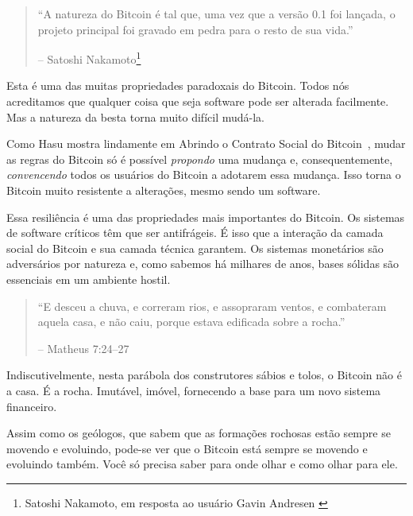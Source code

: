 \begin{quotation}\begin{samepage}
\enquote{A natureza do Bitcoin é tal que, uma vez que a versão 0.1 foi lançada, o projeto principal foi gravado em pedra para o resto de sua vida.}
\begin{flushright} -- Satoshi Nakamoto\footnote{Satoshi Nakamoto, em resposta ao usuário Gavin Andresen \cite{satoshi-centralized-nature}}
\end{flushright}\end{samepage}\end{quotation}

Esta é uma das muitas propriedades paradoxais do Bitcoin. Todos nós acreditamos que qualquer coisa que seja software pode ser alterada facilmente. Mas a natureza da besta torna muito difícil mudá-la.

Como Hasu mostra lindamente em Abrindo o Contrato Social do Bitcoin~\cite{contrato-social}, mudar as regras do Bitcoin só é possível \textit{propondo} uma mudança e, consequentemente, \textit{convencendo} todos os usuários do Bitcoin a adotarem essa mudança. Isso torna o Bitcoin muito resistente a alterações, mesmo sendo um software.

Essa resiliência é uma das propriedades mais importantes do Bitcoin. Os sistemas de software críticos têm que ser antifrágeis. É isso que a interação da camada social do Bitcoin e sua camada técnica garantem. Os sistemas monetários são adversários por natureza e, como sabemos há milhares de anos, bases sólidas são essenciais em um ambiente hostil.

\begin{quotation}\begin{samepage}
\enquote{E desceu a chuva, e correram rios, e assopraram ventos, e combateram aquela casa, e não caiu, porque estava edificada sobre a rocha.}
\begin{flushright} -- Matheus 7:24--27
\end{flushright}\end{samepage}\end{quotation}

Indiscutivelmente, nesta parábola dos construtores sábios e tolos, o Bitcoin não é a casa. É a rocha. Imutável, imóvel, fornecendo a base para um novo sistema financeiro.

Assim como os geólogos, que sabem que as formações rochosas estão sempre se movendo e evoluindo, pode-se ver que o Bitcoin está sempre se movendo e evoluindo também. Você só precisa saber para onde olhar e como olhar para ele.

